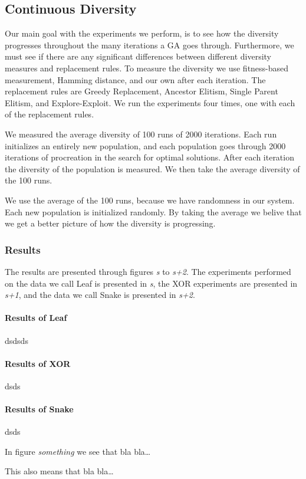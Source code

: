 \subsection{Continuous Diversity}
\label{sec:continuousdiversity}

Our main goal with the experiments we perform, is to see how the diversity progresses throughout the many iterations a GA goes through. Furthermore, we must see if there are any significant differences between different diversity measures and replacement rules. To measure the diversity we use fitness-based measurement, Hamming distance, and our own \dia{} after each iteration. The replacement rules are Greedy Replacement, Ancestor Elitism, Single Parent Elitism, and Explore-Exploit. We run the experiments four times, one with each of the replacement rules.

We measured the average diversity of \num{100} runs of \num{2000} iterations. Each run initializes an entirely new population, and each population goes through \num{2000} iterations of procreation in the search for optimal solutions. After each iteration the diversity of the population is measured. We then take the average diversity of the \num{100} runs. %

We use the average of the \num{100} runs, because we have randomness in our system. Each new population is initialized randomly. By taking the average we belive that we get a better picture of how the diversity is progressing.

\subsubsection{Results}
The results are presented through figures \emph{s} to \emph{s+2}. The experiments performed on the data we call Leaf is presented in \emph{s}, the XOR experiments are presented in \emph{s+1}, and the data we call Snake is presented in \emph{s+2}.

\paragraph{Results of Leaf} dsdsds

\paragraph{Results of XOR} dsds

\paragraph{Results of Snake} dsds

In figure \emph{something} we see that bla bla\dots

This also means that bla bla\dots




